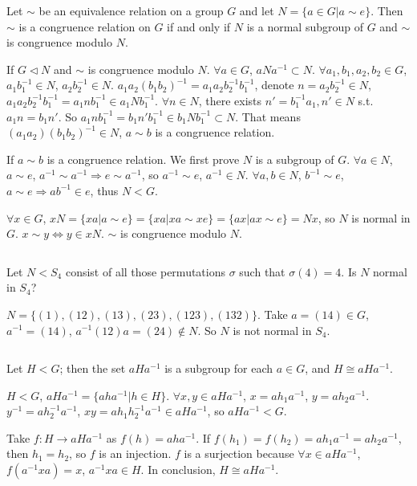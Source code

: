$$ $$

\begin{ex}
    Let $\sim$ be an equivalence relation on a group $G$ and let $N=\{a\in G |a\sim e\}$. Then $\sim$ is a congruence relation on $G$ if and only if $N$ is a normal subgroup of $G$ and $\sim$ is congruence modulo $N$.
\end{ex}

\begin{answer}
    If $G\lhd N$ and $\sim$ is congruence modulo $N$. $\forall a\in G$, $aNa^{-1}\subset N$. $\forall a_{1}, b_{1}, a_{2}, b_{2}\in G$, $a_{1}b_{1}^{-1}\in N$, $a_{2}b_{2}^{-1}\in N$. $a_{1}a_{2}(b_{1}b_{2})^{-1}=a_{1}a_{2}b_{2}^{-1}b_{1}^{-1}$, denote $n=a_{2}b_{2}^{-1}\in N$, $a_{1}a_{2}b_{2}^{-1}b_{1}^{-1}=a_{1}nb_{1}^{-1}\in a_{1}Nb_{1}^{-1}$. $\forall n\in N$, there exists $n'=b_{1}^{-1}a_{1}, n'\in N$ s.t. $a_{1}n=b_{1}n'$. So $a_{1}nb_{1}^{-1}=b_{1}n'b_{1}^{-1}\in b_{1}Nb_{1}^{-1}\subset N$. That means $(a_{1}a_{2})(b_{1}b_{2})^{-1}\in N$, $a\sim b$ is a congruence relation.

    If $a\sim b$ is a congruence relation. We first prove $N$ is a subgroup of $G$. $\forall a\in N$, $a\sim e$, $a^{-1}\sim a^{-1}\Rightarrow e\sim a^{-1}$, so $a^{-1}\sim e$, $a^{-1}\in N$. $\forall a,b \in N$, $b^{-1}\sim e$, $a\sim e\Rightarrow ab^{-1}\in e$, thus $N<G$.

    $\forall x\in G$, $xN=\{xa|a\sim e\}=\{xa|xa\sim xe\}=\{ax|ax\sim e\}=Nx$, so $N$ is normal in $G$. $x\sim y\Leftrightarrow y\in xN$. $\sim$ is congruence modulo $N$.
\end{answer}

$$ $$

\begin{ex}
    Let $N<S_{4}$ consist of all those permutations $\sigma$ such that $\sigma(4)=4$. Is $N$ normal in $S_{4}$?
\end{ex}

\begin{answer}
    $N=\{(1),(12),(13),(23),(123),(132)\}$. Take $a=(14)\in G$, $a^{-1}=(14)$, $a^{-1}(12)a=(24)\notin N$. So $N$ is not normal in $S_{4}$.
\end{answer}

$$ $$

\begin{ex}
    Let $H<G$; then the set $aHa^{-1}$ is a subgroup for each $a\in G$, and $H\cong aHa^{-1}$. 
\end{ex}

\begin{answer}
    $H<G$, $aHa^{-1}=\{aha^{-1}|h\in H\}$. $\forall x,y\in aHa^{-1}$, $x=ah_{1}a^{-1}$, $y=ah_{2}a^{-1}$. $y^{-1}=ah_{2}^{-1}a^{-1}$, $xy=ah_{1}h_{2}^{-1}a^{-1}\in aHa^{-1}$, so $aHa^{-1}< G$.

     Take $f: H\to aHa^{-1}$ as $f(h)=aha^{-1}$. If $f(h_{1})=f(h_{2})=ah_{1}a^{-1}=ah_{2}a^{-1}$, then $h_{1}=h_{2}$, so $f$ is an injection. $f$ is a surjection because $\forall x\in aHa^{-1}$, $f(a^{-1}xa)=x$, $a^{-1}xa\in H$. In conclusion, $H\cong aHa^{-1}$.
\end{answer}

